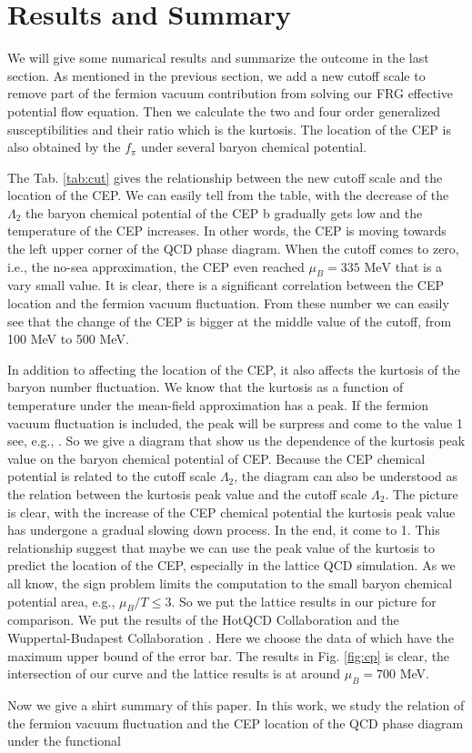 \documentclass[%
reprint,
superscriptaddress,
showpacs,preprintnumbers,
 amsmath,amssymb,
 aps,
prd,
]{revtex4-1}
\begin{document}
\section{Results and Summary}
\label{sec:res}
We will give some numarical results and summarize the outcome in the last section. As mentioned in the previous section, we add a new cutoff scale to remove part of the fermion vacuum contribution from solving our FRG effective potential flow equation. Then we calculate the two and four order generalized susceptibilities and their ratio which is the kurtosis. The location of the CEP is also obtained by the $f_\pi$ under several baryon chemical potential. \par The Tab. \ref{tab:cut} gives the relationship between the new cutoff scale and the location of the CEP. We can easily tell from the table, with the decrease of the $\Lambda_2$ the baryon chemical potential of the CEP  b gradually gets low and the temperature of the CEP increases. In other words, the CEP is moving towards the left upper corner of the QCD phase diagram. When the cutoff comes to zero, i.e., the no-sea approximation, the CEP even reached $\mu_B=335\,\,\mathrm{MeV}$ that is a vary small value. It is clear, there is a significant correlation between the CEP location and the fermion vacuum fluctuation. From these number we can easily see that the change of the CEP is bigger at the middle value of the cutoff, from 100 MeV to 500 MeV.\par In addition to affecting the location of the CEP, it also affects the kurtosis of the baryon number fluctuation. We know that the kurtosis as a function of temperature under the mean-field approximation has a peak. If the fermion vacuum fluctuation is included, the peak will be surpress and come to the value 1 see, e.g., \cite{Skokov:2010sf}. So we give a diagram that show us the dependence of the kurtosis peak value on the baryon chemical potential of CEP. Because the CEP chemical potential is related to the cutoff scale $\Lambda_2$, the diagram can also be understood as the relation between the kurtosis peak value and the cutoff scale $\Lambda_2$. The picture is clear, with the increase of the CEP chemical potential the kurtosis peak value has undergone a gradual slowing down process. In the end, it come to 1. This relationship suggest that maybe we can use the peak value of the kurtosis to predict the location of the CEP, especially in the lattice QCD simulation.  As we all know, the sign problem limits the computation to the small baryon chemical potential area, e.g., $\mu_B/T\leqslant 3$. So we put the lattice results in our picture for comparison. We put the results of the HotQCD Collaboration \cite{Bazavov:2017dus,Bazavov:2017tot} and the Wuppertal-Budapest Collaboration \cite{Borsanyi:2013hza}. Here we choose the data of which have the maximum upper bound of the error bar. The results in Fig. \ref{fig:cp} is clear, the intersection of our curve and the lattice results is at around $\mu_B=700$ MeV. \par Now we give a shirt summary of this paper. In this work, we study the relation of the fermion vacuum fluctuation and the CEP location of the QCD phase diagram under the functional 
\end{document}

